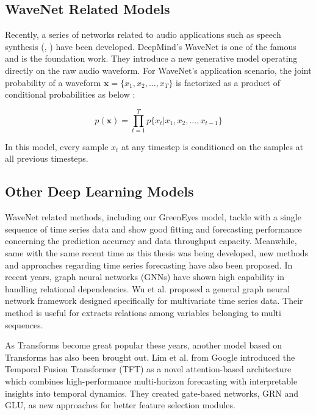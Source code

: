 \subsection{WaveNet Related Models}
Recently, a series of networks related to audio applications such as speech synthesis (\cite{shen2018natural}, \cite{wang2017tacotron}) have been developed. DeepMind's WaveNet \cite{oord2016wavenet} is one of the famous and is the foundation work. They introduce a new generative model operating directly on the raw audio waveform. For WaveNet's application scenario, the joint probability of a waveform $\textbf{x}=\{x_1,x_2,...,x_T\}$ is factorized as a product of conditional probabilities as below \cite{oord2016wavenet}:

\begin{equation}
    p(\textbf{x})=\prod_{t=1}^Tp\{x_t|x_1,x_2,...,x_{t-1}\}
\end{equation}

In this model, every sample $x_t$ at any timestep is conditioned on the samples at all previous timesteps.

\subsection{Other Deep Learning Models}

WaveNet related methods, including our GreenEyes model, tackle with a single sequence of time series data and show good fitting and forecasting performance concerning the prediction accuracy and data throughput capacity. Meanwhile, same with the same recent time as this thesis was being developed, new methods and approaches regarding time series forecasting have also been proposed. In recent years, graph neural networks (GNNs) have shown high capability in handling relational dependencies. Wu et al. \cite{wu2020connecting} proposed a general graph neural network framework designed specifically for multivariate time series data. Their method is useful for extracts relations among variables belonging to multi sequences.

As Transforms \cite{vaswani2017attention} become great popular these years, another model based on Transforms has also been brought out. Lim et al. \cite{lim2021temporal} from Google introduced the Temporal Fusion Transformer (TFT) as a novel attention-based architecture which combines high-performance multi-horizon forecasting with interpretable insights into temporal dynamics. They created gate-based networks, GRN and GLU, as new approaches for better feature selection modules.
